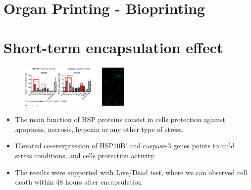 \section{Organ Printing - Bioprinting}

\section{Short-term encapsulation effect}

\begin{figure}[H]
        \centering
        \includegraphics[width=0.5\textwidth]{short_term.png}
        \caption{\label{fig:short_term}}
\end{figure}

\begin{multicols}{2}
    \begin{itemize}
        \item The main function of HSP proteins consist in cells protection against apoptosis, necrosis, hypoxia or any other type of stress.
        \item Elevated co-erexpression of HSP70B' and caspase-3 genes points to mild stress conditions, and cells protection activity.
        \item The results were supported with Live/Dead test, where we can observed cell death within 48 hours after encapsulation
    \end{itemize}
\end{multicols}
